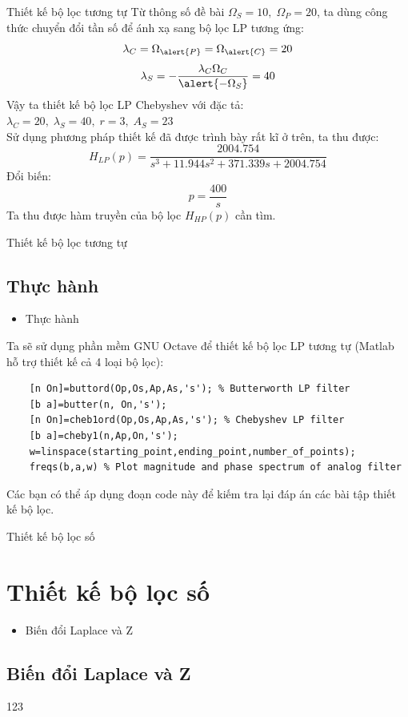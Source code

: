 \documentclass[8pt]{beamer}
\begin{document}
\begin{frame}{Thiết kế bộ lọc tương tự}
Từ thông số đề bài $\Omega_{S}=10,\;\Omega_{P}=20$, ta dùng công thức chuyển đổi tần số để ánh xạ sang bộ lọc LP tương ứng:
$$\lambda_{C}=\Omega_{\alert{P}}=\Omega_{\alert{C}}=20$$
$$\lambda_{S}=-\frac{\lambda_{C}\Omega_{C}}{\alert{-\Omega_{S}}}=40$$
Vậy ta thiết kế bộ lọc LP Chebyshev với đặc tả: $\lambda_{C}=20,\;\lambda_{S}=40,\;r=3,\;A_{S}=23$
\\ Sử dụng phương pháp thiết kế đã được trình bày rất kĩ ở trên, ta thu được:
$$H_{LP}(p)=\frac{2004.754}{s^3+11.944s^2+371.339s+2004.754}$$
Đổi biến: $$p=\frac{400}{s}$$
Ta thu được hàm truyền của bộ lọc $H_{HP}(p)$ cần tìm.
\end{frame}
\begin{frame}[fragile]{Thiết kế bộ lọc tương tự}
\subsection{Thực hành}
\begin{itemize}
	\item Thực hành
\end{itemize}
Ta sẽ sử dụng phần mềm GNU Octave để thiết kế bộ lọc LP tương tự (Matlab hỗ trợ thiết kế cả 4 loại bộ lọc):
\begin{verbatim}
	[n On]=buttord(Op,Os,Ap,As,'s'); % Butterworth LP filter
	[b a]=butter(n, On,'s');
	[n On]=cheb1ord(Op,Os,Ap,As,'s'); % Chebyshev LP filter
	[b a]=cheby1(n,Ap,On,'s'); 
	w=linspace(starting_point,ending_point,number_of_points);
	freqs(b,a,w) % Plot magnitude and phase spectrum of analog filter
\end{verbatim}
Các bạn có thể áp dụng đoạn code này để kiếm tra lại đáp án các bài tập thiết kế bộ lọc.
\end{frame}
\begin{frame}{Thiết kế bộ lọc số}
	\section{Thiết kế bộ lọc số}
\begin{itemize}
	\item Biến đổi Laplace và Z
\end{itemize}
\subsection{Biến đổi Laplace và Z}
123
\end{frame}
\end{document}
